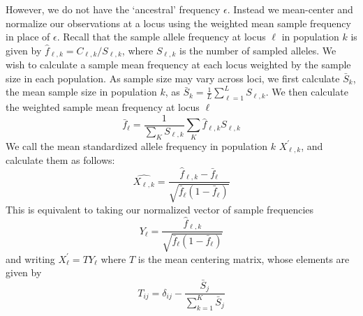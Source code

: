 \documentclass[12pt]{article}
\newcommand{\plrm}[1]{\todo[color=green!20]{#1}}
\newcommand{\plrm}[1]{\plr{#1}}
\newcommand{\plr}[1]{{\it\color{green}{(#1)}}}
\newcommand{\gc}[1]{{\it\color{blue}{(#1)}}}
\begin{document}
%
%
However, we do not have the `ancestral' frequency $\epsilon$. Instead we mean-center and normalize our observations at a locus using the weighted mean sample frequency in place of $\epsilon$.  
Recall that the sample allele frequency at locus $\ell$ in population $k$ is given by $\hat{f}_{\ell,k} = C_{\ell,k}/S_{\ell,k}$,  
where $S_{\ell,k}$ is the number of sampled alleles.
We wish to calculate a sample mean frequency at each locus weighted by the sample size in each population.  As sample size may vary across loci, we first calculate $\bar{S}_k$, the mean sample size in population $k$, as $\bar{S}_k = \frac{1}{L}\sum_{\ell=1}^L S_{\ell,k}$.  We then calculate the weighted sample mean frequency at locus $\ell$ 
%
\begin{equation}
\label{eq:sample_mean_freq}
\bar{f}_{\ell} = \frac{1}{\sum_K S_{\ell,k}} \sum_K \hat{f}_{\ell,k} S_{\ell,k}
\end{equation}
We call the mean standardized allele frequency in population $k$ $X_{\ell,k}^{\prime}$, and calculate them as follows:
\begin{equation}
\hat{X_{\ell,k}} = \frac{ \hat{f}_{\ell,k} - \bar{f}_{\ell} } {\sqrt{\bar{f}_{\ell}(1-\bar{f}_{\ell})}}
\end{equation}
%
This is equivalent to taking our normalized vector of sample frequencies
\begin{equation}
Y_{\ell} = \frac{ \hat{f}_{\ell,k} } {\sqrt{\bar{f}_{\ell}(1-\bar{f}_{\ell})}}
\end{equation}
and writing $X_{\ell}^{\prime} = T Y_{\ell} $ where $T$ is the mean centering matrix, whose elements are given by \plrm{define $\delta_{ij}$}
\begin{equation}
T_{ij} = \delta_{ij}  -  \frac{\bar{S}_j}{\sum\limits_{k=1}^{K} \bar{S}_j	} 
\end{equation}
\end{document}
